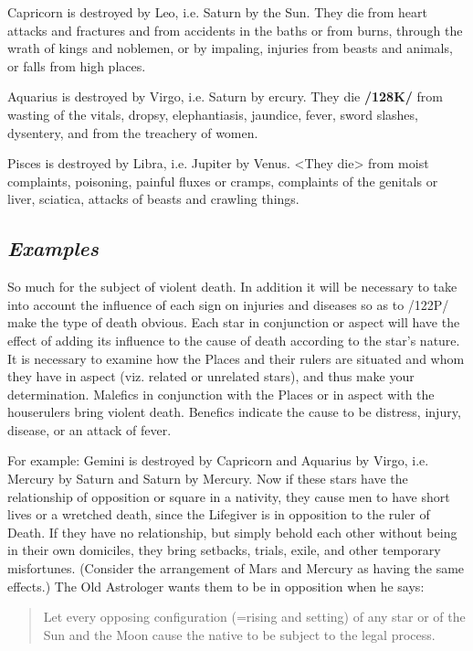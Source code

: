 Capricorn \mn{\Capricorn} is destroyed by Leo, i.e. Saturn by the Sun. They die from heart attacks and fractures and from accidents in the baths or from burns, through the wrath of kings and noblemen, or by impaling, injuries from beasts and animals, or falls from high places.

Aquarius \mn{\Aquarius} is destroyed by Virgo, i.e. Saturn by ercury. They die \textbf{/128K/} from wasting of the vitals, dropsy, elephantiasis, jaundice, fever, sword slashes, dysentery, and from the treachery of women.

Pisces \mn{\Pisces} is destroyed by Libra, i.e. Jupiter by Venus. <They die> from moist complaints, poisoning, painful fluxes or cramps, complaints of the genitals or liver, sciatica, attacks of beasts and crawling things.

\subsection{\textit{Examples}}
So much for the subject of violent death. In addition it will be necessary to take into account the influence of each sign on injuries and diseases so as to /122P/ make the type of death obvious. Each star in conjunction or aspect will have the effect of adding its influence to the cause of death according to the star’s nature. It is necessary to examine how the Places and their rulers are situated and whom they have in
aspect (viz. related or unrelated stars), and thus make your determination. Malefics in conjunction with the Places or in aspect with the houserulers bring violent death. Benefics indicate the cause to be distress, injury, disease, or an attack of fever. 

For example: Gemini is destroyed by Capricorn and Aquarius by Virgo, i.e. Mercury by Saturn and Saturn by Mercury. Now if these stars have the relationship of opposition or square in a nativity, they cause men to have short lives or a wretched death, since the Lifegiver is in opposition to the ruler of Death. If they have no relationship, but simply behold each other without being in their own domiciles, they bring setbacks, trials, exile, and other temporary misfortunes. (Consider the arrangement of Mars and Mercury as having the same effects.) The Old Astrologer wants them to be in opposition when he says: \begin{quote}Let every opposing configuration (=rising and setting) of any star or of the Sun and the Moon cause the native to be subject to the legal process.\end{quote}

